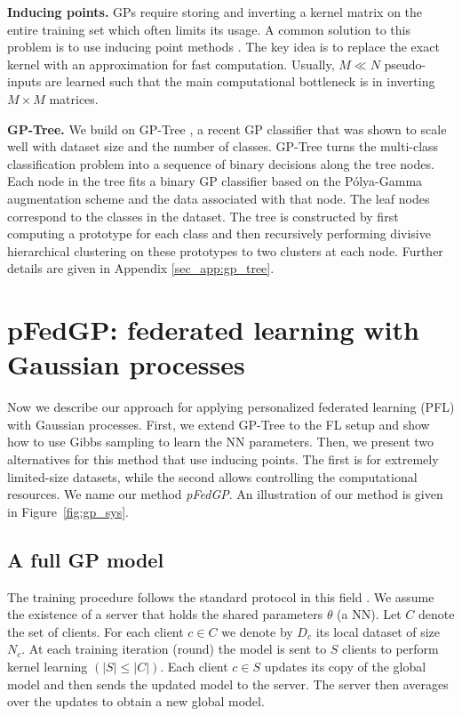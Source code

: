\documentclass{article}
\def\Figref#1{Figure~\ref{#1}}
\newcommand{\pg}{P\'olya-Gamma }
\begin{document}
\textbf{Inducing points.} GPs require storing and inverting a kernel matrix on the entire training set which often limits its usage. A common solution to this problem is to use inducing point methods \cite{quinonero2005unifying, sneldon_Gharamani_IP}. The key idea is to replace the exact kernel with an approximation for fast computation. Usually, $M \ll N$ pseudo-inputs are learned such that the main computational bottleneck is in inverting $M \times M$ matrices. 

\textbf{GP-Tree.} 
We build on GP-Tree \cite{achituve2021gp_icml}, a recent GP classifier that was shown to scale well with dataset size and the number of classes. GP-Tree turns the multi-class classification problem into a sequence of binary decisions along the tree nodes. Each node in the tree fits a binary GP classifier based on the \pg augmentation scheme and the data associated with that node. The leaf nodes correspond to the classes in the dataset. The tree is constructed by first computing a prototype for each class and then recursively performing divisive hierarchical clustering on these prototypes to two clusters at each node. Further details are given in Appendix \ref{sec_app:gp_tree}.





\section{pFedGP: federated learning with Gaussian processes} \label{sec:pFedGP}
Now we describe our approach for applying personalized federated learning (PFL) with Gaussian processes.
First, we extend GP-Tree to the FL setup and show how to use Gibbs sampling to learn the NN parameters. Then, we present two alternatives for this method that use inducing points. The first is for extremely limited-size datasets, while the second allows controlling the computational resources. We name our method \textit{pFedGP}. An illustration of our method is given in \Figref{fig:gp_sys}. 

\subsection{A full GP model} \label{sub_sec:full_gp}
The training procedure follows the standard protocol in this field \cite{arivazhagan2019federated, liang2020think, mcmahan2017communication}. We assume the existence of a server that holds the shared parameters $\theta$ (a NN). 
Let $C$ denote the set of clients. For each client $c\in C$ we denote by $D_c$  its local dataset of size $N_c$. At each training iteration (round) the model is sent to $S$ clients to perform kernel learning $(|S| \leq |C|)$. Each client $c \in S$ updates its copy of the global model and then sends the updated model to the server. The server then averages over the updates to obtain a new global model. 
\end{document}
